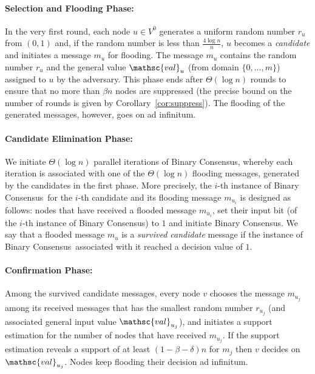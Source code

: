 \documentclass[leqno,11pt]{article}
\newcommand{\val}{{\mathsc{val}}}
\newcommand{\bc}{{\sc Binary Consensus}}
\begin{document}
\paragraph{Selection and Flooding Phase:} 
  In the very first round, each node $u \in V^0$ generates
  a uniform random number $r_u$ from $(0,1)$ and, if the random number is less
  than $\frac{4\log n}{n}$, $u$ becomes a \emph{candidate} and initiates a message $m_u$ for flooding.
  The
  message $m_u$ contains the random number $r_u$ and the general value $\val_u$ (from domain $\{0,\dots,m\}$) assigned to $u$ by the adversary.
  This phase ends after $\Theta(\log n)$ rounds to ensure that no more than $\beta n$
  nodes are suppressed (the precise bound on the number of rounds is given by  Corollary~\ref{cor:suppress}).
  The flooding of the generated messages, however, goes on ad infinitum.

\paragraph{Candidate Elimination Phase:}
  We  initiate $\Theta(\log n)$ parallel
  iterations of \bc, whereby each iteration is associated with one of the  $\Theta(\log n)$ flooding messages, generated by the candidates in the first phase.
  More precisely, the $i$-th instance of \bc\ for the $i$-th candidate and its flooding message $m_{u_i}$ is designed as follows:
  nodes that have received a flooded message $m_{u_i}$, set
  their input bit (of the $i$-th instance of \bc) to $1$ and initiate \bc.
  We say that a flooded message $m_u$ is
  a {\em survived candidate} message if the instance of \bc\ associated with it reached a
  decision value of $1$. 
  

\paragraph{Confirmation Phase:} 
  Among the survived candidate messages, every node $v$
  chooses the message $m_{u_j}$ among its received messages that has the smallest random number $r_{u_j}$ (and associated general input value
  $\val_{u_j}$), and initiates a support estimation for the number of nodes that have received $m_{u_j}$.
  If the support estimation reveals a support of at least $(1-\beta - \delta)n$ for $m_j$ then $v$ decides on $\val_{u_j}$. 
  Nodes keep flooding their decision ad infinitum.
\end{document}
